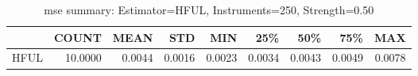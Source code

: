 \begin{table}[ht]
\centering
\caption{mse summary: Estimator=HFUL, Instruments=250, Strength=0.50}
\begin{tabular}{lrrrrrrrr}
\toprule
 & COUNT & MEAN & STD & MIN & 25\% & 50\% & 75\% & MAX \\
\midrule
HFUL & 10.0000 & 0.0044 & 0.0016 & 0.0023 & 0.0034 & 0.0043 & 0.0049 & 0.0078 \\
\bottomrule
\end{tabular}
\end{table}
